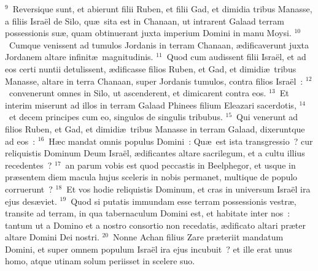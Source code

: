 ${}^{9}$~Reversique sunt, et abierunt filii Ruben, et filii Gad, et dimidia tribus Manasse, a filiis Isra\"el de Silo, qu\ae\ sita est in Chanaan, ut intrarent Galaad terram possessionis su\ae , quam obtinuerant juxta imperium Domini in manu Moysi.
${}^{10}$~Cumque venissent ad tumulos Jordanis in terram Chanaan, \ae dificaverunt juxta Jordanem altare infinit\ae\ magnitudinis.
${}^{11}$~Quod cum audissent filii Isra\"el, et ad eos certi nuntii detulissent, \ae dificasse filios Ruben, et Gad, et dimidi\ae\ tribus Manasse, altare in terra Chanaan, super Jordanis tumulos, contra filios Isra\"el~:
${}^{12}$~convenerunt omnes in Silo, ut ascenderent, et dimicarent contra eos.
${}^{13}$~Et interim miserunt ad illos in terram Galaad Phinees filium Eleazari sacerdotis,
${}^{14}$~et decem principes cum eo, singulos de singulis tribubus.
${}^{15}$~Qui venerunt ad filios Ruben, et Gad, et dimidi\ae\ tribus Manasse in terram Galaad, dixeruntque ad eos~:
${}^{16}$~H\ae c mandat omnis populus Domini~: Qu\ae\ est ista transgressio~? cur reliquistis Dominum Deum Isra\"el, \ae dificantes altare sacrilegum, et a cultu illius recedentes~?
${}^{17}$~an parum vobis est quod peccastis in Beelphegor, et usque in pr\ae sentem diem macula hujus sceleris in nobis permanet, multique de populo corruerunt~?
${}^{18}$~Et vos hodie reliquistis Dominum, et cras in universum Isra\"el ira ejus des\ae viet.
${}^{19}$~Quod si putatis immundam esse terram possessionis vestr\ae , transite ad terram, in qua tabernaculum Domini est, et habitate inter nos~: tantum ut a Domino et a nostro consortio non recedatis, \ae dificato altari pr\ae ter altare Domini Dei nostri.
${}^{20}$~Nonne Achan filius Zare pr\ae teriit mandatum Domini, et super omnem populum Isra\"el ira ejus incubuit~? et ille erat unus homo, atque utinam solum periisset in scelere suo.


